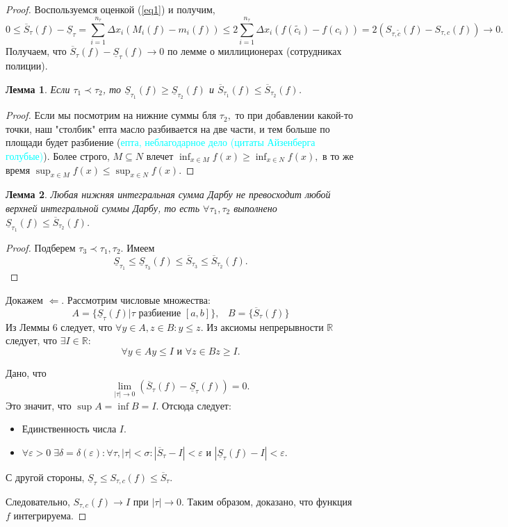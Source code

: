 \documentclass{article}
\theoremstyle{plain}
\newtheorem{lemma}{Лемма}
\theoremstyle{definition}
\theoremstyle{remark}
\renewcommand{\*}{\cdot}
\begin{document}
\begin{proof}
Воспользуемся оценкой (\ref{eq1}) и получим, 
$$0\leq \overline{S}_{\tau}(f) - \underline{S}_{\tau} = \sum_{i=1}^{n_{\tau}} \Delta x_i(M_i(f) - m_i(f)) \leq 2 \sum_{i=1}^{n_{\tau}} \Delta x_i(f(\widetilde{c_i}) - f(c_i)) = 2(S_{\tau, \widetilde{c}}(f) - S_{\tau, c}(f)) \to 0.$$
Получаем, что $\overline{S}_{\tau}(f) - \underline{S}_{\tau}(f) \to 0$ по лемме о миллиционерах (сотрудниках полиции).\\



\begin{lemma}
Если  $\tau_1 \prec \tau_2$, то $\underline{S}_{\tau_1}(f) \geq \underline{S}_{\tau_2}(f)$ и $\overline{S}_{\tau_1}(f) \leq \overline{S}_{\tau_2}(f)$.
\end{lemma}
\begin{proof}
Если мы посмотрим на нижние суммы  бля $\tau_2,$ то при добавлении какой-то точки, наш "столбик" епта масло разбивается на две части, и тем больше по площади будет разбиение (\textcolor{cyan}{епта, неблагодарное дело (цитаты Айзенберга голубые)}). Более строго, $M\subseteq N$ влечет $\inf_{x \in M}f(x) \geq \inf_{x \in N}f(x),$ в то же время $\sup_{x \in M}f(x) \leq \sup_{x \in N}f(x).$
\end{proof}
\begin{lemma}
Любая нижняя интегральная сумма Дарбу не превосходит любой верхней интегральной суммы Дарбу, то есть $\forall \tau_1, \tau_2$  выполнено $\underline{S}_{\tau_1}(f) \leq \overline{S}_{\tau_2}(f)$.
\end{lemma}
\begin{proof}
Подберем $\tau_3 \prec \tau_1, \tau_2.$ Имеем 
\[
\underline{S}_{\tau_1} \leq \underline{S}_{\tau_3}(f) \leq \overline{S}_{\tau_3} \leq \overline{S}_{\tau_2}(f).
\]
\end{proof}


Докажем $\Leftarrow$. 
Рассмотрим числовые множества:
$$A = \{\underline{S}_{\tau}(f) | \tau \text{ разбиение } [a, b]\},\;\;\;B = \{\overline{S}_{\tau}(f)\}$$
Из Леммы 6 следует, что $\forall y \in A, z \in B : y \leq z.$ Из аксиомы непрерывности $\mathbb{R}$ следует, что $\exists I\in \mathbb{R}$:
$$\forall y\in A y\leq I \text{ и } \forall z\in B z\geq I.$$

Дано, что $$\lim_{|\tau| \to 0} (\overline{S}_{\tau}(f) - \underline{S}_{\tau}(f)) = 0.$$ Это значит, что $\sup A = \inf B = I$. Отсюда следует:
\begin{itemize}
    \item Единственность числа $I.$
    \item $\forall \varepsilon > 0\; \exists \delta = \delta(\varepsilon): \forall \tau, |\tau| < \sigma: |\overline{S}_{\tau} - I| < \varepsilon$ и $|\underline{S}_{\tau}(f) - I| < \varepsilon$.
\end{itemize}

С другой стороны, $\underline{S}_{\tau} \leq S_{\tau, c}(f) \leq \overline{S}_{\tau}$.

Следовательно, $S_{\tau, c}(f) \to I$ при $|\tau| \to 0.$ Таким образом, доказано, что функция $f$ интегрируема.
\end{proof}
\end{document}
